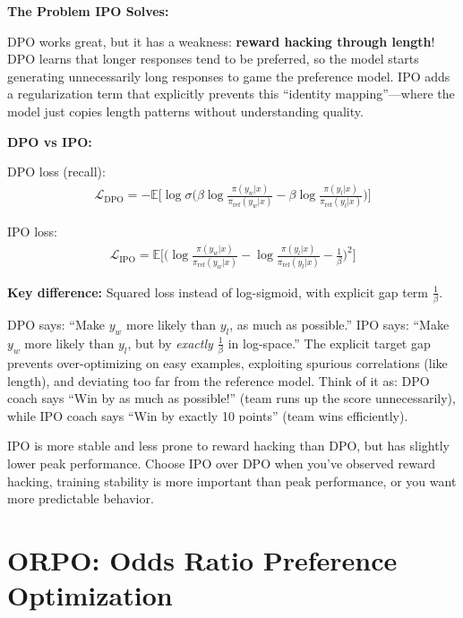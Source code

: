 \begin{chapterenv}
\begin{infobox}
\textbf{The Problem IPO Solves:}

DPO works great, but it has a weakness: \textbf{reward hacking through length}! DPO learns that longer responses tend to be preferred, so the model starts generating unnecessarily long responses to game the preference model. IPO adds a regularization term that explicitly prevents this ``identity mapping''---where the model just copies length patterns without understanding quality.
\end{infobox}

\textbf{DPO vs IPO:}

DPO loss (recall):
\begin{align*}
\mathcal{L}_{\text{DPO}} = -\mathbb{E}\Big[ \log \sigma\Big( \beta \log \frac{\pi(y_w | x)}{\pi_{\text{ref}}(y_w | x)} - \beta \log \frac{\pi(y_l | x)}{\pi_{\text{ref}}(y_l | x)} \Big) \Big]
\end{align*}

IPO loss:
\begin{align*}
\mathcal{L}_{\text{IPO}} = \mathbb{E}\Big[ \Big( \log \frac{\pi(y_w | x)}{\pi_{\text{ref}}(y_w | x)} - \log \frac{\pi(y_l | x)}{\pi_{\text{ref}}(y_l | x)} - \frac{1}{\beta} \Big)^2 \Big]
\end{align*}

\textbf{Key difference:} Squared loss instead of log-sigmoid, with explicit gap term $\frac{1}{\beta}$.

DPO says: ``Make $y_w$ more likely than $y_l$, as much as possible.'' IPO says: ``Make $y_w$ more likely than $y_l$, but by \textit{exactly} $\frac{1}{\beta}$ in log-space.'' The explicit target gap prevents over-optimizing on easy examples, exploiting spurious correlations (like length), and deviating too far from the reference model. Think of it as: DPO coach says ``Win by as much as possible!'' (team runs up the score unnecessarily), while IPO coach says ``Win by exactly 10 points'' (team wins efficiently).

\begin{tipbox}
IPO is more stable and less prone to reward hacking than DPO, but has slightly lower peak performance. Choose IPO over DPO when you've observed reward hacking, training stability is more important than peak performance, or you want more predictable behavior.
\end{tipbox}

\section{ORPO: Odds Ratio Preference Optimization}


\end{chapterenv}
